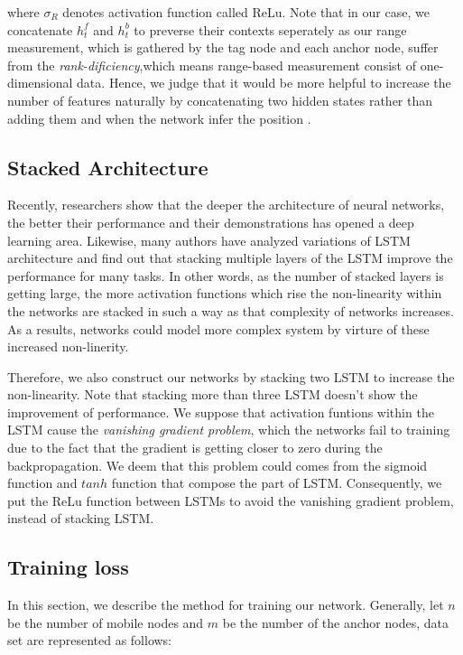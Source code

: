 \documentclass[letterpaper, 10 pt, conference]{ieeeconf}  %
\begin{document}
where $\sigma _{R}$ denotes activation function called ReLu. Note that in our case, we concatenate $h^{f}_{t}$ and $h^{b}_{t}$ to preverse their contexts seperately as our range measurement, which is gathered by the tag node and each anchor node, suffer from the \textit{rank-dificiency},which means range-based measurement consist of one-dimensional data\cite{fabresse2013undelayed}. Hence, we judge that it would be more helpful to increase the number of features naturally by concatenating two hidden states rather than adding them and when the network infer the position  .

\subsection{Stacked Architecture}

Recently, researchers show that the deeper the architecture of neural networks, the better their performance\cite{simonyan2014very, he2016deep} and their demonstrations has opened a deep learning area. Likewise, many authors have analyzed variations of LSTM architecture and find out that stacking multiple layers of the LSTM improve the performance for many tasks\cite{graves2013hybrid, graves2013speech,ullah2018action}. In other words, as the number of stacked layers is getting large, the more activation functions which rise the non-linearity within the networks are stacked  in such a way as that complexity of networks increases. As a results, networks could model more complex system by virture of these increased non-linerity.

Therefore, we also construct our networks by stacking two LSTM to increase the non-linearity. Note that stacking more than three LSTM doesn't show the improvement of performance. We suppose that activation funtions within the LSTM cause the \textit{vanishing gradient problem}\cite{pascanu2013difficulty}, which the networks fail to training due to the fact that the gradient is getting closer to zero during the backpropagation. We deem that this problem could comes from the sigmoid function and $tanh$ function that compose the part of LSTM. Consequently, we put the ReLu function between LSTMs to avoid the vanishing gradient problem\cite{nair2010rectified}, instead of stacking LSTM.    


\subsection{Training loss}

In this section, we describe the method for training our network. Generally, let $n$ be the number of mobile nodes and $m$ be the number of the anchor nodes, data set are represented as follows:
\end{document}
